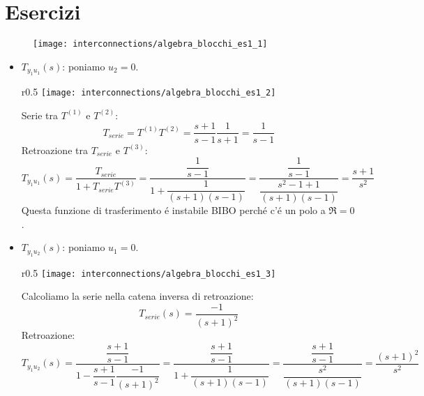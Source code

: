 \documentclass[../main.tex]{subfiles}
\begin{document}
	\section{Esercizi}
		\begin{mdframed}[style=Exercise]
			\begin{Exercise}[title={Calcolare tutte le funzioni di trasferimento}, difficulty=3]
				\begin{figure}[H]
					\centering\texttt{[image: interconnections/algebra\_blocchi\_es1\_1]}
				\end{figure}
				\begin{itemize}
					\item 
						$ T_{y_1 u_1}(s) $: poniamo $ u_2 = 0 $.\\
						\parbox[t]{\dimexpr\textwidth-\leftmargin}{%
							\vspace{-2.5mm}
							\begin{wrapfigure}{r}{0.5\textwidth}
								\centering
								\vspace{-\baselineskip}
								\texttt{[image: interconnections/algebra\_blocchi\_es1\_2]}
							\end{wrapfigure}
							Serie tra $ T^{(1)} $ e $ T^{(2)} $:
							\[
								T_{serie} = T^{(1)} T^{(2)} = \dfrac{s+1}{s-1} \dfrac{1}{s+1} = \dfrac{1}{s-1}
							\]
							Retroazione tra $ T_{serie} $ e $ T^{(3)} $:
							\[
								T_{y_1 u_1}(s) = \dfrac{T_{serie}}{1 + T_{serie} T^{(3)}} = \dfrac{\dfrac{1}{s-1}}{1+\dfrac{1}{(s+1)(s-1)}} = \dfrac{\dfrac{1}{s-1}}{\dfrac{s^2-1+1}{(s+1)(s-1)}} = \dfrac{s+1}{s^2}
							\]
							Questa funzione di trasferimento \'e instabile BIBO perch\'e c'\'e un polo a $ \Re = 0 $.
						}
					\item 
						$ T_{y_1 u_2}(s) $: poniamo $ u_1 = 0 $.\\
						\parbox[t]{\dimexpr\textwidth-\leftmargin}{%
							\vspace{-2.5mm}
							\begin{wrapfigure}[10]{r}{0.5\textwidth}
								\centering
								\vspace{-\baselineskip}
								\texttt{[image: interconnections/algebra\_blocchi\_es1\_3]}
							\end{wrapfigure}
							Calcoliamo la serie nella catena inversa di retroazione:
							\[ 
								T_{serie}(s) = \frac{-1}{(s+1)^2}
							\]
							Retroazione:
							\[ 
								T_{y_1 u_2}(s) = \dfrac{\dfrac{s+1}{s-1}}{1-\dfrac{s+1}{s-1}\dfrac{-1}{(s+1)^2}} = \dfrac{\dfrac{s+1}{s-1}}{1 + \dfrac{1}{(s+1)(s-1)}} = \dfrac{\dfrac{s+1}{s-1}}{\dfrac{s^2}{(s+1)(s-1)}} = \dfrac{(s+1)^2}{s^2}
							\]
						}
					

\end{itemize}
\end{Exercise}
\end{mdframed}
\end{document}
